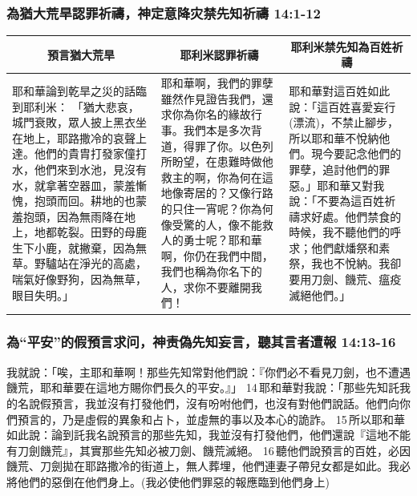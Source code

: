 \subsubsection{為猶大荒旱認罪祈禱，神定意降灾禁先知祈禱 14:1-12}
\begin{table}[H]
\centering
\begin{tabular}{p{6.25cm}|p{5.50cm}|p{5.2cm}}\hline\hline
\multicolumn{1}{c|}{預言猶大荒旱}&\multicolumn{1}{c|}{耶利米認罪祈禱}&\multicolumn{1}{c}{耶利米禁先知為百姓祈禱}\\\hline
耶和華論到乾旱之災的話臨到耶利米：
「猶大悲哀，城門衰敗，眾人披上黑衣坐在地上，耶路撒冷的哀聲上達。他們的貴胄打發家僮打水，他們來到水池，見沒有水，就拿著空器皿，蒙羞慚愧，抱頭而回。耕地的也蒙羞抱頭，因為無雨降在地上，地都乾裂。田野的母鹿生下小鹿，就撇棄，因為無草。野驢站在淨光的高處，喘氣好像野狗，因為無草，眼目失明。」
&耶和華啊，我們的罪孽雖然作見證告我們，還求你為你名的緣故行事。我們本是多次背道，得罪了你。以色列所盼望，在患難時做他救主的啊，你為何在這地像寄居的？又像行路的只住一宵呢？你為何像受驚的人，像不能救人的勇士呢？耶和華啊，你仍在我們中間，我們也稱為你名下的人，求你不要離開我們！
&耶和華對這百姓如此說：「這百姓喜愛妄行(漂流)，不禁止腳步，所以耶和華不悅納他們。現今要記念他們的罪孽，追討他們的罪惡。」耶和華又對我說：「不要為這百姓祈禱求好處。他們禁食的時候，我不聽他們的呼求；他們獻燔祭和素祭，我也不悅納。我卻要用刀劍、饑荒、瘟疫滅絕他們。」\\\hline
\end{tabular}
\end{table}


\subsubsection{為“平安”的假預言求问，神责偽先知妄言，聽其言者遭報 14:13-16}
我就說：「唉，主耶和華啊！那些先知常對他們說：『你們必不看見刀劍，也不遭遇饑荒，耶和華要在這地方賜你們長久的平安。』」 
14 耶和華對我說：「那些先知託我的名說假預言，我並沒有打發他們，沒有吩咐他們，也沒有對他們說話。他們向你們預言的，乃是虛假的異象和占卜，並虛無的事以及本心的詭詐。 
15 所以耶和華如此說：論到託我名說預言的那些先知，我並沒有打發他們，他們還說『這地不能有刀劍饑荒』，其實那些先知必被刀劍、饑荒滅絕。 16 聽他們說預言的百姓，必因饑荒、刀劍拋在耶路撒冷的街道上，無人葬埋，他們連妻子帶兒女都是如此。我必將他們的惡倒在他們身上。(我必使他們罪惡的報應臨到他們身上)

